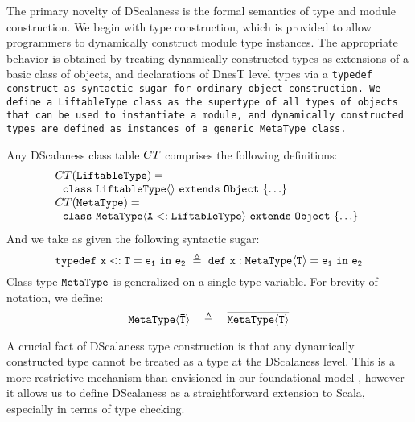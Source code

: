 The primary novelty of DScalaness is the formal semantics of type and module construction. We
begin with type construction, which is provided to allow programmers to dynamically construct
module type instances. The appropriate behavior is obtained by treating dynamically constructed
types as extensions of a basic class of objects, and declarations of DnesT level types via a
\tt{typedef} construct as syntactic sugar for ordinary object construction. We define a
\tt{LiftableType} class as the supertype of all types of objects that can be used to instantiate
a module, and dynamically constructed types are defined as instances of a generic \tt{MetaType}
class.
\begin{definition}
\label{def-metatype}
Any DScalaness class table $\CT$ comprises the following definitions:
$$
\hspace{-4pt}
\begin{array}{l}
\CT(\tt{LiftableType}) = \\
\ \ \gclass{\tt{LiftableType}}{}{Object}{\ldots}\\
\CT(\tt{MetaType}) = \\
\ \ \gclass{\tt{MetaType}}{\tt{X <: LiftableType}}{Object}{ \ldots }
\end{array}
$$
And we take as given the following syntactic sugar:
$$
\jtlet{x}{T}{e_1}{e_2}\ \defeq\ \jdef{x}{\jinst{MetaType}{T}}{e_1}{e_2}
$$
Class type $\tt{MetaType}$ is generalized on a single type variable. For brevity of notation, we
define:
$$
\jinst{\tt{MetaType}}{\ttvec{T}}\quad \defeq \quad \overline{\jinst{MetaType}{T}}
$$
\end{definition}
A crucial fact of DScalaness type construction is that any dynamically constructed type cannot
be treated as a type at the DScalaness level. This is a more restrictive mechanism than
envisioned in our foundational model \cite{FramedML}, however it allows us to define DScalaness
as a straightforward extension to Scala, especially in terms of type checking.

